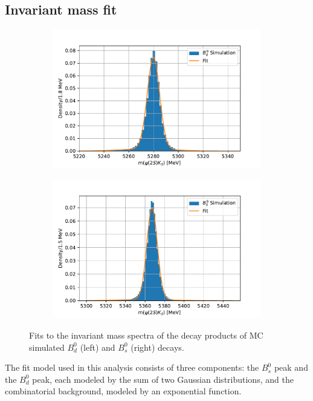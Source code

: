\subsection{Invariant mass fit}
\begin{figure}[tb]
  \centering
  \begin{subfigure}{.49\textwidth}
    \includegraphics[width=\linewidth]{plots/B0_fit.pdf}
  \end{subfigure}
  \begin{subfigure}{.49\textwidth}
    \includegraphics[width=\linewidth]{plots/BS_fit.pdf}
  \end{subfigure}
  \caption{Fits to the invariant mass spectra of the decay products of MC simulated $B^0_d$ (left) and $B^0_s$ (right) decays.}
  \label{fig:MC_fits}
\end{figure}
The fit model used in this analysis consists of three components: the $B^0_s$ peak and the $B^0_d$ peak, each modeled by the sum of two Gaussian distributions, and the combinatorial background, modeled by an exponential function.
